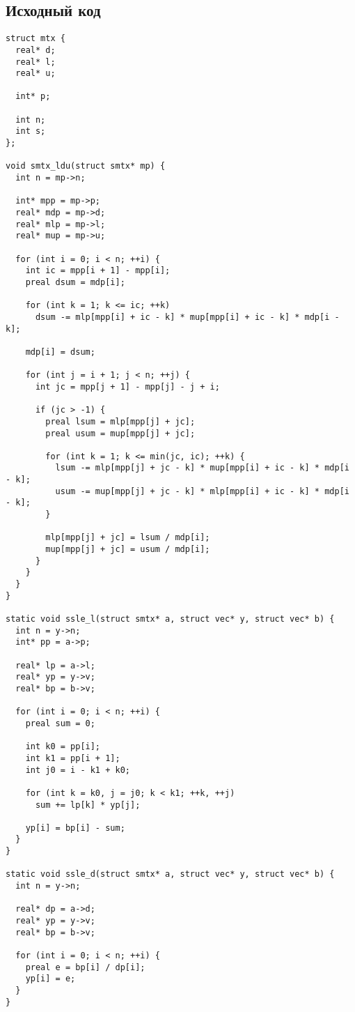 \documentclass[12pt, a4paper]{article}
\begin{document}
\subsection{Исходный код}

\begin{verbatim}
struct mtx {
  real* d;
  real* l;
  real* u;

  int* p;

  int n;
  int s;
};

void smtx_ldu(struct smtx* mp) {
  int n = mp->n;

  int* mpp = mp->p;
  real* mdp = mp->d;
  real* mlp = mp->l;
  real* mup = mp->u;

  for (int i = 0; i < n; ++i) {
    int ic = mpp[i + 1] - mpp[i];
    preal dsum = mdp[i];

    for (int k = 1; k <= ic; ++k)
      dsum -= mlp[mpp[i] + ic - k] * mup[mpp[i] + ic - k] * mdp[i - k];

    mdp[i] = dsum;

    for (int j = i + 1; j < n; ++j) {
      int jc = mpp[j + 1] - mpp[j] - j + i;

      if (jc > -1) {
        preal lsum = mlp[mpp[j] + jc];
        preal usum = mup[mpp[j] + jc];

        for (int k = 1; k <= min(jc, ic); ++k) {
          lsum -= mlp[mpp[j] + jc - k] * mup[mpp[i] + ic - k] * mdp[i - k];
          usum -= mup[mpp[j] + jc - k] * mlp[mpp[i] + ic - k] * mdp[i - k];
        }

        mlp[mpp[j] + jc] = lsum / mdp[i];
        mup[mpp[j] + jc] = usum / mdp[i];
      }
    }
  }
}

static void ssle_l(struct smtx* a, struct vec* y, struct vec* b) {
  int n = y->n;
  int* pp = a->p;

  real* lp = a->l;
  real* yp = y->v;
  real* bp = b->v;

  for (int i = 0; i < n; ++i) {
    preal sum = 0;

    int k0 = pp[i];
    int k1 = pp[i + 1];
    int j0 = i - k1 + k0;

    for (int k = k0, j = j0; k < k1; ++k, ++j)
      sum += lp[k] * yp[j];

    yp[i] = bp[i] - sum;
  }
}

static void ssle_d(struct smtx* a, struct vec* y, struct vec* b) {
  int n = y->n;

  real* dp = a->d;
  real* yp = y->v;
  real* bp = b->v;

  for (int i = 0; i < n; ++i) {
    preal e = bp[i] / dp[i];
    yp[i] = e;
  }
}


\end{verbatim}
\end{document}

